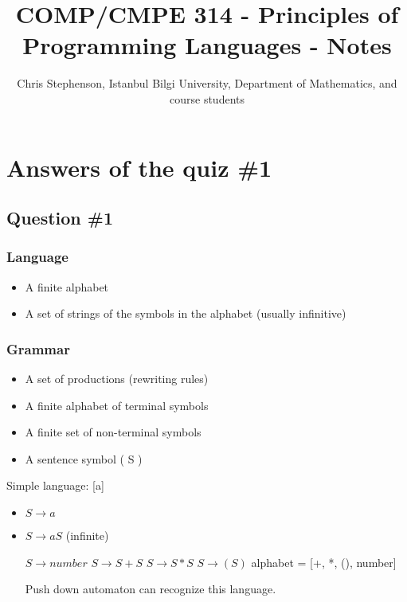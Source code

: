 \documentclass{article}
\begin{document}
\title{COMP/CMPE 314 - Principles of Programming Languages - Notes}
\author{Chris Stephenson, Istanbul Bilgi University, Department of Mathematics, and course students}
\maketitle


\section*{Answers of the quiz \#1}
\subsection*{Question \#1}
\subsubsection*{Language}
  \begin{itemize}
        \item A finite alphabet
        \item A set of strings of the symbols in the alphabet (usually infinitive)
   \end{itemize}
 
\subsubsection*{Grammar}
  \begin{itemize}
   \item A set of productions (rewriting rules)
   \item A finite alphabet of terminal symbols
   \item A finite set of non-terminal symbols
   \item A sentence symbol ( S )
  \end{itemize}

Simple language: [a] 
  \begin{itemize}
   \item $S \rightarrow a$
   \item $S \rightarrow aS$ (infinite)
   
   $S \rightarrow number$\newline
   $S \rightarrow S + S$\newline
   $S \rightarrow S * S$\newline
   $S \rightarrow (S)$\newline
   alphabet = [+, *, (), number]
   
   Push down automaton can recognize this language.
  \end{itemize}
  
\end{document}
